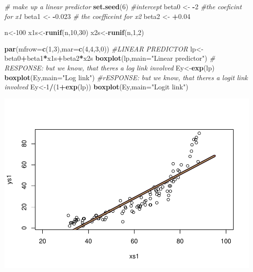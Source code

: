 \documentclass[
]{book}
\newenvironment{Shaded}{\begin{snugshade}}{\end{snugshade}}
\newcommand{\AttributeTok}[1]{\textcolor[rgb]{0.13,0.29,0.53}{#1}}
\newcommand{\CommentTok}[1]{\textcolor[rgb]{0.56,0.35,0.01}{\textit{#1}}}
\newcommand{\DecValTok}[1]{\textcolor[rgb]{0.00,0.00,0.81}{#1}}
\newcommand{\FloatTok}[1]{\textcolor[rgb]{0.00,0.00,0.81}{#1}}
\newcommand{\FunctionTok}[1]{\textcolor[rgb]{0.13,0.29,0.53}{\textbf{#1}}}
\newcommand{\NormalTok}[1]{#1}
\newcommand{\OtherTok}[1]{\textcolor[rgb]{0.56,0.35,0.01}{#1}}
\newcommand{\SpecialCharTok}[1]{\textcolor[rgb]{0.81,0.36,0.00}{\textbf{#1}}}
\newcommand{\StringTok}[1]{\textcolor[rgb]{0.31,0.60,0.02}{#1}}
\begin{document}
\begin{Shaded}
\begin{Highlighting}[]
\CommentTok{\# make up a linear predictor}
\FunctionTok{set.seed}\NormalTok{(}\DecValTok{6}\NormalTok{)}
\CommentTok{\#intercept}
\NormalTok{beta0 }\OtherTok{\textless{}{-}} \SpecialCharTok{{-}}\DecValTok{2}
\CommentTok{\#the coeficint for x1}
\NormalTok{beta1 }\OtherTok{\textless{}{-}} \SpecialCharTok{{-}}\FloatTok{0.023}
\CommentTok{\# the coefficeint for x2}
\NormalTok{beta2 }\OtherTok{\textless{}{-}} \SpecialCharTok{+}\FloatTok{0.04}

\NormalTok{n}\OtherTok{\textless{}{-}}\DecValTok{100}
\NormalTok{x1s}\OtherTok{\textless{}{-}}\FunctionTok{runif}\NormalTok{(n,}\DecValTok{10}\NormalTok{,}\DecValTok{30}\NormalTok{)}
\NormalTok{x2s}\OtherTok{\textless{}{-}}\FunctionTok{runif}\NormalTok{(n,}\DecValTok{1}\NormalTok{,}\DecValTok{2}\NormalTok{)}

\FunctionTok{par}\NormalTok{(}\AttributeTok{mfrow=}\FunctionTok{c}\NormalTok{(}\DecValTok{1}\NormalTok{,}\DecValTok{3}\NormalTok{),}\AttributeTok{mar=}\FunctionTok{c}\NormalTok{(}\DecValTok{4}\NormalTok{,}\DecValTok{4}\NormalTok{,}\DecValTok{3}\NormalTok{,}\DecValTok{0}\NormalTok{))}
\CommentTok{\#LINEAR PREDICTOR}
\NormalTok{lp}\OtherTok{\textless{}{-}}\NormalTok{beta0}\SpecialCharTok{+}\NormalTok{beta1}\SpecialCharTok{*}\NormalTok{x1s}\SpecialCharTok{+}\NormalTok{beta2}\SpecialCharTok{*}\NormalTok{x2s}
\FunctionTok{boxplot}\NormalTok{(lp,}\AttributeTok{main=}\StringTok{"Linear predictor"}\NormalTok{)}
\CommentTok{\# RESPONSE: but we know, that there\textquotesingle{}s a log link involved}
\NormalTok{Ey}\OtherTok{\textless{}{-}}\FunctionTok{exp}\NormalTok{(lp)}
\FunctionTok{boxplot}\NormalTok{(Ey,}\AttributeTok{main=}\StringTok{"Log link"}\NormalTok{)}
\CommentTok{\#rESPONSE: but we know, that there\textquotesingle{}s a logit link involved}
\NormalTok{Ey}\OtherTok{\textless{}{-}}\DecValTok{1}\SpecialCharTok{/}\NormalTok{(}\DecValTok{1}\SpecialCharTok{+}\FunctionTok{exp}\NormalTok{(lp))}
\FunctionTok{boxplot}\NormalTok{(Ey,}\AttributeTok{main=}\StringTok{"Logit link"}\NormalTok{)}
\end{Highlighting}
\end{Shaded}

\includegraphics{ECOMODbook_files/figure-latex/unnamed-chunk-29-1.pdf}
\end{document}
